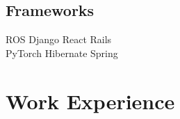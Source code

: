 \documentclass[]{_deedy-resume}
\begin{document}
\begin{minipage}[t]{0.33\textwidth}
\subsection{Frameworks}
ROS \textbullet{} Django \textbullet{} React \textbullet{} Rails \\
PyTorch \textbullet{} Hibernate \textbullet{} Spring

%
%

\end{minipage}
\hfill
\begin{minipage}[t]{0.66\textwidth}


\section{Work Experience}




\end{minipage}
\end{document}
